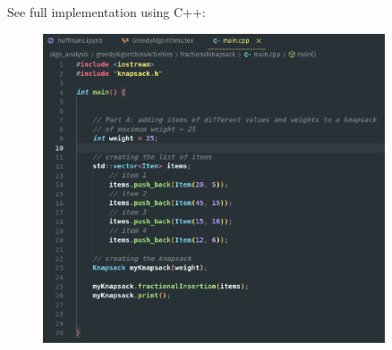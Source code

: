 \documentclass{article}
\begin{document}
    \begin{center}
        \begin{minipage}[t]{0.9\textwidth}
            See full implementation using C++:
            \begin{figure}[H]
                \centering
                \includegraphics[width=0.9\textwidth, height=0.5\textheight]{./partc.png}
            \end{figure}
        \end{minipage}
    \end{center}
\end{document}
